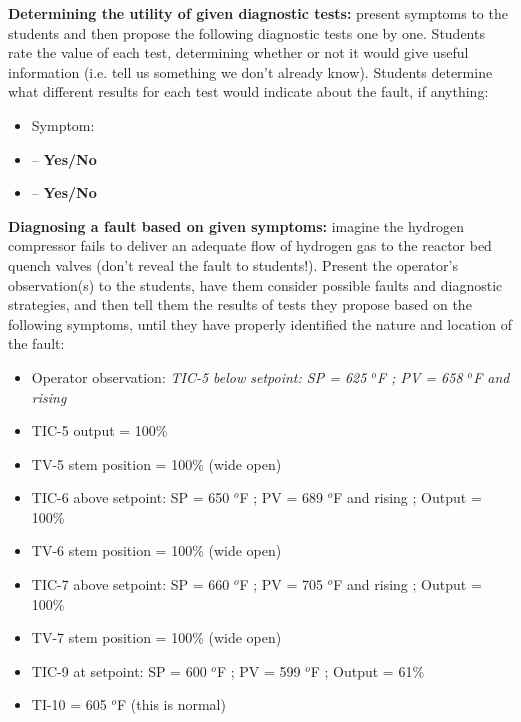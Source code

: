 \vskip 10pt


\noindent
{\bf Determining the utility of given diagnostic tests:} present symptoms to the students and then propose the following diagnostic tests one by one.  Students rate the value of each test, determining whether or not it would give useful information (i.e. tell us something we don't already know).  Students determine what different results for each test would indicate about the fault, if anything:

\begin{itemize}
\item{} Symptom: {\it }
\item{}  -- {\bf Yes/No}
\item{}  -- {\bf Yes/No}
\end{itemize}


\vskip 10pt


\noindent
{\bf Diagnosing a fault based on given symptoms:} imagine the hydrogen compressor fails to deliver an adequate flow of hydrogen gas to the reactor bed quench valves (don't reveal the fault to students!).  Present the operator's observation(s) to the students, have them consider possible faults and diagnostic strategies, and then tell them the results of tests they propose based on the following symptoms, until they have properly identified the nature and location of the fault:

\begin{itemize}
\item{} Operator observation: {\it TIC-5 below setpoint: SP = 625 $^{o}$F ; PV = 658 $^{o}$F and rising}
\item{} TIC-5 output = 100\%
\item{} TV-5 stem position = 100\% (wide open)
\item{} TIC-6 above setpoint: SP = 650 $^{o}$F ; PV = 689 $^{o}$F and rising ; Output = 100\%
\item{} TV-6 stem position = 100\% (wide open)
\item{} TIC-7 above setpoint: SP = 660 $^{o}$F ; PV = 705 $^{o}$F and rising ; Output = 100\%
\item{} TV-7 stem position = 100\% (wide open)
\item{} TIC-9 at setpoint: SP = 600 $^{o}$F ; PV = 599 $^{o}$F ; Output = 61\%
\item{} TI-10 = 605 $^{o}$F (this is normal)
\end{itemize}





